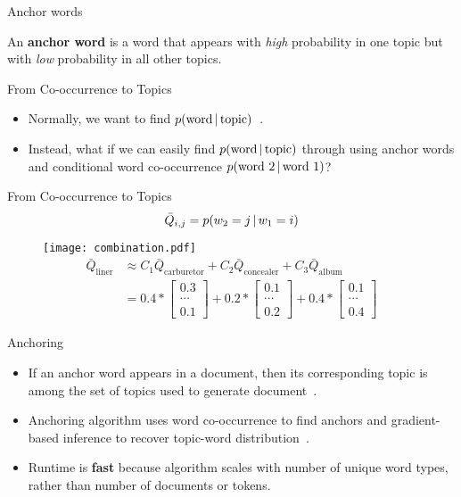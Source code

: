 \begin{frame}{Anchor words}
\begin{definition}
An \textbf{anchor word} is a word that appears with \emph{high} probability in one topic but with \emph{low} probability in all other topics.
\end{definition}
\end{frame}

\begin{frame}{From Co-occurrence to Topics}
\begin{itemize}
\item Normally, we want to find \(p(\text{word} \, | \, \text{topic}) \)~\citep{blei-2003}.
\item Instead, what if we can easily find \(p(\text{word} \, | \, \text{topic})\) through using anchor words and conditional word co-occurrence \(p(\text{word 2} \, | \, \text{word 1})\)?
\end{itemize}
\end{frame}


\begin{frame}{From Co-occurrence to Topics}
\begin{equation*}
\bar{Q}_{i,j} = p(w_2 = j \, | \, w_1 = i)
\end{equation*}
\begin{figure}
\texttt{[image: combination.pdf]}
\begin{align*}
\bar{Q}_{\text{liner}} &\approx C_1 \bar{Q}_{\text{carburetor}} + C_2 \bar{Q}_{\text{concealer}} + C_3 \bar{Q}_{\text{album}} \\
&= 0.4 * \begin{bmatrix} 0.3 \\ \cdots \\ 0.1 \end{bmatrix} + 0.2 * \begin{bmatrix} 0.1 \\ \cdots \\ 0.2 \end{bmatrix} + 0.4 * \begin{bmatrix} 0.1 \\ \cdots \\ 0.4 \end{bmatrix}
\end{align*}
\end{figure}
\end{frame}



\begin{frame}{Anchoring}
\begin{itemize}
\item If an anchor word appears in a document, then its corresponding topic is among the set of topics used to generate document~\citep{arora-2012-anchor}.
\item Anchoring algorithm uses word co-occurrence to find anchors and gradient-based inference to recover topic-word distribution~\citep{arora-2013}.
\item Runtime is \textbf{fast} because algorithm scales with number of unique word types, rather than number of documents or tokens.
\end{itemize}
\end{frame}

